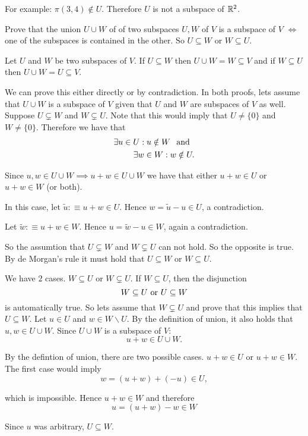 For example: $\pi (3,4) \notin U$. Therefore $U$ is not a subspace of $\mathbb{R}^2$.
\setcounter{xrcs}{11}
\begin{xrcs}
  Prove that the union $U \cup W$ of of two subspaces $U, W$ of $V$ is a subspace of $V$ $\iff$ one of the subspaces is contained in the other. So $U\subseteq W$ or $W \subseteq U$.
\end{xrcs}
\begin{prf}
   Let $U$ and $W$ be two subspaces of $V$. If $U \subseteq W$ then $U \cup W = W \subseteq V$ and if $W \subseteq U$ then $U \cup W = U \subseteq V$.

   We can prove this either directly or by contradiction. In both proofs, lets assume that $U \cup W$ is a subspace of $V$ given that $U$ and $W$ are subspaces of $V$ as well. \\
   Suppose $U \subsetneq W$ and $W \subsetneq U$. Note that this would imply that $U \neq \{0\}$ and $W \neq \{0\}$. Therefore we have that
  \[
  \begin{aligned}
    \exists u \in U: u \notin W \;\;\, \text{and}\;\; \\
    \exists w \in W: w \notin U.
  \end{aligned}
  \]

  Since $u,w \in U \cup W \implies u+w \in U \cup W $ we have that either $u+w \in U$ or $u+w \in W$ (or both).
  \begin{description}
    \item{} In this case, let $\widetilde u :\equiv u + w \in U$. Hence $w = \widetilde{u} - u \in U$, a contradiction.
    \item{} Let $\widetilde w :\equiv u + w \in W$. Hence $u = \widetilde{w} - u \in W$, again a contradiction.
  \end{description}

  So the assumtion that $U \subsetneq W$ and $W \subsetneq U$ can not hold. So the opposite is true. By de Morgan's rule it must hold that $U \subseteq W$ or $W \subseteq U$.

   We have $2$ cases. $W \subseteq U$ or $W \subsetneq U$. If $W \subseteq U$, then the disjunction \[
  W \subseteq U $ or $ U \subseteq W
  \]
  is automatically true. So lets assume that $W \subsetneq U$ and prove that this implies that $U \subseteq W$.
  Let $u \in U$ and $w \in W \backslash U$. By the definition of union, it also holds that $u,w \in U \cup W$. Since $U \cup W$ is a subspace of $V$:
  \[
    u+w \in U \cup W.
  \]

  By the defintion of union, there are two possible cases. $u+w \in U$ or $u+w \in W$. The first case would imply
  \[
    w = (u+w) + (-u) \in U,
  \]

  which is impossible. Hence $u+w \in W$ and therefore
  \[
    u= (u+w) -w \in W
  \]

  Since $u$ was arbitrary, $U \subseteq W$.
\end{prf}

